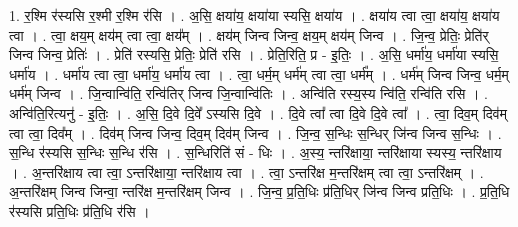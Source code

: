 \documentclass[17pt]{extarticle}
\begin{document}
1. र॒श्मि र॑स्यसि र॒श्मी र॒श्मि र॑सि । . अ॒सि॒ क्षया॑य॒ क्षया॑या स्यसि॒ क्षया॑य । . क्षया॑य त्वा त्वा॒ क्षया॑य॒ क्षया॑य त्वा । . त्वा॒ क्षय॒म् क्षय॑म् त्वा त्वा॒ क्षय᳚म् । . क्षय॑म् जिन्व जिन्व॒ क्षय॒म् क्षय॑म् जिन्व । . जि॒न्व॒ प्रेतिः॒ प्रेति॑र् जिन्व जिन्व॒ प्रेतिः॑ । . प्रेति॑ रस्यसि॒ प्रेतिः॒ प्रेति॑ रसि । . प्रेति॒रिति॒ प्र - इ॒तिः॒ । . अ॒सि॒ धर्मा॑य॒ धर्मा॑या स्यसि॒ धर्मा॑य । . धर्मा॑य त्वा त्वा॒ धर्मा॑य॒ धर्मा॑य त्वा । . त्वा॒ धर्म॒म् धर्म॑म् त्वा त्वा॒ धर्म᳚म् । . धर्म॑म् जिन्व जिन्व॒ धर्म॒म् धर्म॑म् जिन्व । . जि॒न्वान्वि॑ति॒ रन्वि॑तिर् जिन्व जि॒न्वान्वि॑तिः । . अन्वि॑ति रस्य॒स्य न्वि॑ति॒ रन्वि॑ति रसि । . अन्वि॑ति॒रित्यनु॑ - इ॒तिः॒ । . अ॒सि॒ दि॒वे दि॒वे᳚ ऽस्यसि दि॒वे । . दि॒वे त्वा᳚ त्वा दि॒वे दि॒वे त्वा᳚ । . त्वा॒ दिव॒म् दिव॑म् त्वा त्वा॒ दिव᳚म् । . दिव॑म् जिन्व जिन्व॒ दिव॒म् दिव॑म् जिन्व । . जि॒न्व॒ स॒न्धिः स॒न्धिर् जि॑न्व जिन्व स॒न्धिः । . स॒न्धि र॑स्यसि स॒न्धिः स॒न्धि र॑सि । . स॒न्धिरिति॑ सं - धिः । . अ॒स्य॒ न्तरि॑क्षाया॒ न्तरि॑क्षाया स्यस्य॒ न्तरि॑क्षाय । . अ॒न्तरि॑क्षाय त्वा त्वा॒ ऽन्तरि॑क्षाया॒ न्तरि॑क्षाय त्वा । . त्वा॒ ऽन्तरि॑क्ष म॒न्तरि॑क्षम् त्वा त्वा॒ ऽन्तरि॑क्षम् । . अ॒न्तरि॑क्षम् जिन्व जिन्वा॒ न्तरि॑क्ष म॒न्तरि॑क्षम् जिन्व । . जि॒न्व॒ प्र॒ति॒धिः प्र॑ति॒धिर् जि॑न्व जिन्व प्रति॒धिः । . प्र॒ति॒धि र॑स्यसि प्रति॒धिः प्र॑ति॒धि र॑सि । \newline
\end{document}
